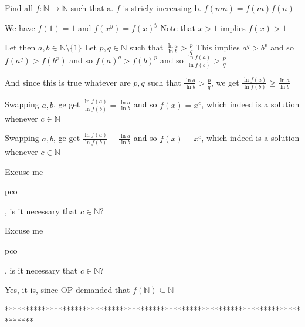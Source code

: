\begin{solution}
	\begin{tcolorbox}Find all $f: \mathbb{N} \to \mathbb{N}$ such that
a. $f$ is stricly increasing
b.  $f(mn)=f(m)f(n)$\end{tcolorbox}
We have $f(1)=1$ and $f(x^y)=f(x)^y$
Note that $x>1$ implies $f(x)>1$

Let then $a,b\in\mathbb N\setminus\{1\}$
Let $p,q\in\mathbb N$ such that $\frac{\ln a}{\ln b}>\frac pq$
This implies $a^q>b^p$ and so $f(a^q)>f(b^p)$ and so $f(a)^q>f(b)^p$ and so $\frac{\ln f(a)}{\ln f(b)}>\frac pq$

And since this is true whatever are $p,q$ such that $\frac{\ln a}{\ln b}>\frac pq$, we get $\frac{\ln f(a)}{\ln f(b)}\ge \frac{\ln a}{\ln b}$

Swapping $a,b$, ge get  $\frac{\ln f(a)}{\ln f(b)}=\frac{\ln a}{\ln b}$ and so $\boxed{f(x)=x^c}$, which indeed is a solution whenever $c\in\mathbb N$
\end{solution}



\begin{solution}
	\begin{tcolorbox}
Swapping $a,b$, ge get  $\frac{\ln f(a)}{\ln f(b)}=\frac{\ln a}{\ln b}$ and so $\boxed{f(x)=x^c}$, which indeed is a solution whenever $c\in\mathbb N$\end{tcolorbox}

Excuse me \begin{bolded}pco\end{bolded}, is it necessary that $ c\in\mathbb{N} $?
\end{solution}



\begin{solution}
	\begin{tcolorbox}Excuse me \begin{bolded}pco\end{bolded}, is it necessary that $ c\in\mathbb{N} $?\end{tcolorbox}
Yes, it is, since OP demanded that $f(\mathbb N)\subseteq\mathbb N$
\end{solution}
*******************************************************************************
-------------------------------------------------------------------------------

